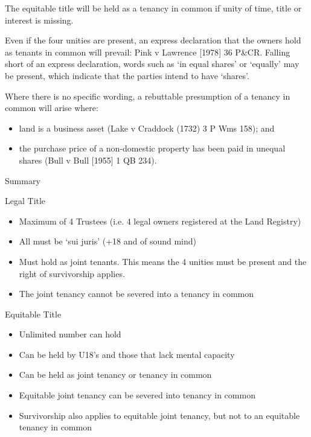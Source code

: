 \documentclass[
]{article}
\providecommand{\tightlist}{%
  \setlength{\itemsep}{0pt}\setlength{\parskip}{0pt}}
\newenvironment{env-d6ce83a0-f7a8-46b6-be95-b1235f1feb63}
{
    \savenotes\tcolorbox[blanker,breakable,left=5pt,borderline west={2pt}{-4pt}{gray}]
}
{
    \endtcolorbox\spewnotes
}
\begin{document}
The equitable title will be held as a tenancy in common if unity of
time, title or interest is missing.

Even if the four unities are present, an express declaration that the
owners hold as tenants in common will prevail: Pink v Lawrence
{[}1978{]} 36 P\&CR. Falling short of an express declaration, words such
as `in equal shares' or `equally' may be present, which indicate that
the parties intend to have `shares'.

Where there is no specific wording, a rebuttable presumption of a
tenancy in common will arise where:

\begin{itemize}
\tightlist
\item
  land is a business asset (Lake v Craddock (1732) 3 P Wms 158); and
\item
  the purchase price of a non-domestic property has been paid in unequal
  shares (Bull v Bull {[}1955{]} 1 QB 234).
\end{itemize}

\begin{env-d6ce83a0-f7a8-46b6-be95-b1235f1feb63}

Summary

Legal Title

\begin{itemize}
\tightlist
\item
  Maximum of 4 Trustees (i.e. 4 legal owners registered at the Land
  Registry)
\item
  All must be `sui juris' (+18 and of sound mind)
\item
  Must hold as joint tenants. This means the 4 unities must be present
  and the right of survivorship applies.
\item
  The joint tenancy cannot be severed into a tenancy in common
\end{itemize}

Equitable Title

\begin{itemize}
\tightlist
\item
  Unlimited number can hold
\item
  Can be held by U18's and those that lack mental capacity
\item
  Can be held as joint tenancy or tenancy in common
\item
  Equitable joint tenancy can be severed into tenancy in common
\item
  Survivorship also applies to equitable joint tenancy, but not to an
  equitable tenancy in common
\end{itemize}

\end{env-d6ce83a0-f7a8-46b6-be95-b1235f1feb63}
\end{document}
